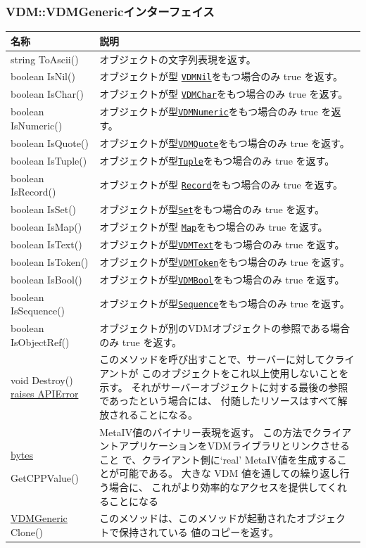 \documentclass[\pformat,12pt]{jarticle}
\newcommand{\pbs}[1]{\let\temp=\\#1\let\\=\temp}
\newenvironment{interfacetable}{%
  \begin{longtable}{|>{\pbs\raggedright\ttfamily}p{6.6cm}%
                    |>{\pbs\raggedright}p{6.6cm}|} \hline
  \textrm{\bfseries 名称} &  \textbf{説明} \\ \hline
  \endhead
  }{\end{longtable}}
\newcommand{\APIError}{\hyperlink{exception.APIError}{raises APIError}}
\newcommand{\VDMGeneric}{\hyperlink{interface.Generic}{VDMGeneric}}
\newcommand{\bytes}{\hyperlink{type.bytes}{bytes}}
\newcommand{\VDMBool}{\hyperlink{interface.VDMBool}{VDMBool}}
\newcommand{\VDMChar}{\hyperlink{interface.VDMChar}{VDMChar}}
\newcommand{\VDMNumeric}{\hyperlink{interface.VDMNumeric}{VDMNumeric}}
\newcommand{\VDMQuote}{\hyperlink{interface.VDMQuote}{VDMQuote}}
\newcommand{\VDMText}{\hyperlink{interface.VDMText}{VDMText}}
\newcommand{\VDMToken}{\hyperlink{interface.VDMToken}{VDMToken}}
\newcommand{\VDMNil}{\hyperlink{interface.VDMNil}{VDMNil}}
\newcommand{\Map}{\hyperlink{interface.VDMMap}{Map}}
\newcommand{\Record}{\hyperlink{interface.VDMRecord}{Record}}
\newcommand{\Sequence}{\hyperlink{interface.VDMSequence}{Sequence}}
\newcommand{\Set}{\hyperlink{interface.VDMSet}{Set}}
\newcommand{\Tuple}{\hyperlink{interface.VDMTuple}{Tuple}}
\begin{document}
\subsubsection{VDM::VDMGenericインターフェイス}
\mbox{}

\begin{interfacetable}
string ToAscii()
  & オブジェクトの文字列表現を返す。
\\ \hline
boolean IsNil()
  & オブジェクトが型 \texttt{\VDMNil}をもつ場合のみ true を返す。
\\ \hline
boolean IsChar()
  & オブジェクトが型 \texttt{\VDMChar}をもつ場合のみ true を返す。
\\ \hline
boolean IsNumeric()
  & オブジェクトが型\texttt{\VDMNumeric}をもつ場合のみ true を返す。
\\ \hline
boolean IsQuote()
  & オブジェクトが型\texttt{\VDMQuote}をもつ場合のみ true を返す。
\\ \hline
boolean IsTuple()
  & オブジェクトが型\texttt{\Tuple}をもつ場合のみ true を返す。
\\ \hline
boolean IsRecord()
  & オブジェクトが型 \texttt{\Record}をもつ場合のみ true を返す。
\\ \hline
boolean IsSet()
  & オブジェクトが型\texttt{\Set}をもつ場合のみ true を返す。
\\ \hline
boolean IsMap()
  & オブジェクトが型 \texttt{\Map}をもつ場合のみ true を返す。
\\ \hline
boolean IsText()
  & オブジェクトが型\texttt{\VDMText}をもつ場合のみ true を返す。
\\ \hline
boolean IsToken()
  & オブジェクトが型\texttt{\VDMToken}をもつ場合のみ true を返す。
\\ \hline
boolean IsBool()
  & オブジェクトが型\texttt{\VDMBool}をもつ場合のみ true を返す。
\\ \hline
boolean IsSequence()
  & オブジェクトが型\texttt{\Sequence}をもつ場合のみ true を返す。
\\ \hline
boolean IsObjectRef()
  & オブジェクトが別のVDMオブジェクトの参照である場合のみ true を返す。
\\ \hline
void Destroy() \APIError
  & このメソッドを呼び出すことで、サーバーに対してクライアントが
    このオブジェクトをこれ以上使用しないことを示す。
    それがサーバーオブジェクトに対する最後の参照であったという場合には、
    付随したリソースはすべて解放されることになる。
\\ \hline
{\bytes} \hyperdef{method}{VDMGenericGetCPPValue}
GetCPPValue()
  &  MetaIV値のバイナリー表現を返す。
    この方法でクライアントアプリケーションをVDMライブラリとリンクさせること
    で、クライアント側に`real' MetaIV値を生成することが可能である。
     大きな VDM 値を通しての繰り返し行う場合に、
     これがより効率的なアクセスを提供してくれることになる
\\ \hline
{\VDMGeneric} Clone()
  & このメソッドは、このメソッドが起動されたオブジェクトで保持されている
    値のコピーを返す。
\\ \hline
\end{interfacetable}
\end{document}
